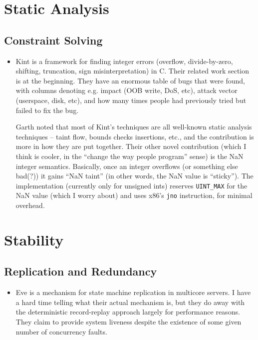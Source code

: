 \documentclass{article}
\begin{document}
\section{Static Analysis}

\subsection{Constraint Solving}
\begin{itemize}
	\item {\sc Kint} \cite{kint} is a framework for finding integer errors (overflow, divide-by-zero, shifting, truncation, sign misinterpretation) in C. Their related work section is at the beginning. They have an enormous table of bugs that were found, with columns denoting e.g. impact (OOB write, DoS, etc), attack vector (userspace, disk, etc), and how many times people had previously tried but failed to fix the bug.

		Garth noted that most of {\sc Kint}'s techniques are all well-known static analysis techniques -- taint flow, bounds checks insertions, etc., and the contribution is more in how they are put together.
		Their other novel contribution (which I think is cooler, in the ``change the way people program'' sense) is the NaN integer semantics.
		Basically, once an integer overflows (or something else bad(?)) it gains ``NaN taint'' (in other words, the NaN value is ``sticky'').
		The implementation (currently only for unsigned ints) reserves {\tt UINT\_MAX} for the NaN value (which I worry about) and uses x86's {\tt jno} instruction, for minimal overhead.
\end{itemize}


\section{Stability}
\subsection{Replication and Redundancy}
\begin{itemize}
	\item Eve \cite{eve} is a mechanism for state machine replication in multicore servers. I have a hard time telling what their actual mechanism is, but they do away with the deterministic record-replay approach largely for performance reasons. They claim to provide system liveness despite the existence of some given number of concurrency faults.
\end{itemize}
\end{document}
